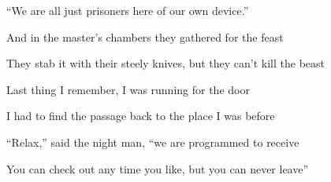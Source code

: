``We are all just prisoners here of our own device.''

And in the master's chambers
they gathered for the feast

They stab it with their steely knives,
but they can't kill the beast
\ks

\zs
Last thing I remember,
I was running for the door

I had to find the passage
back to the place I was before

``Relax,'' said the night man,
``we are programmed to receive

You can check out any time you like,
but you can never leave''
\ks

\kp






















